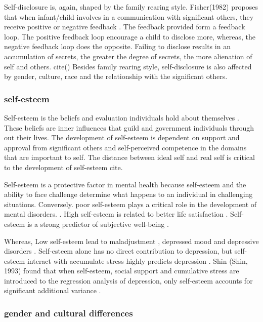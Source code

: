 Self-disclosure is, again, shaped by the family rearing style. Fisher(1982) proposes that when infant/child involves in a communication with significant others, they receive positive or negative feedback . The feedback provided form a feedback loop. The positive feedback loop encourage a child to disclose more, whereas, the negative feedback loop does the opposite. Failing to disclose results in an accumulation of secrets, the greater the degree of secrets, the more alienation of self and others. cite() Besides family rearing style, self-disclosure is also affected by gender, culture, race and the relationship with the significant others.

\subsubsection{self-esteem}
Self-esteem is the beliefs and evaluation individuals hold about themselves \cite{burns1982self}. These beliefs are inner influences that guild and government individuals through out their lives. The development of self-esteem is dependent on support and approval from significant others and self-perceived competence in the domains that are important to self. The distance between ideal self and real self is critical to the development of self-esteem cite. 

Self-esteem is a protective factor in mental health because self-esteem and the ability to face challenge determine what happens to an individual in challenging situations. Conversely. poor self-esteem plays a critical role in the development of mental disorders. \cite{mann2004self}. High self-esteem is related to better life satisfaction \cite{zimmerman2000self}.  Self-esteem is a strong predictor of subjective well-being \cite{furnham2000perceived}. 

Whereas, Low self-esteem lead to maladjustment \cite{garmezy1984study}, depressed mood and depressive disorders \cite{rice1998self,dori1999depression}. Self-esteem alone has no direct contribution to depression, but self-esteem interact with accumulate stress highly predicts depression \cite{miller1989self}.  Shin (Shin, 1993) found that when self-esteem, social support and cumulative stress are introduced to the regression analysis of depression, only self-esteem accounts for significant additional variance \cite{shin1993factors}. 

\subsubsection{gender and cultural differences}

